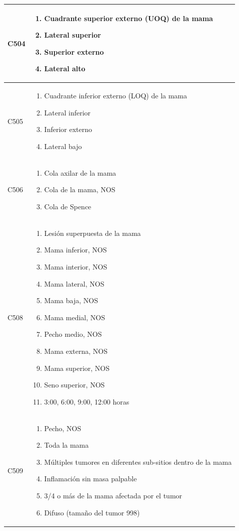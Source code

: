 \begin{table}
\begin{threeparttable}[hbt!]
\begin{tabular}{ p{2cm} p{6cm}}
			\\ \hline
			C504
			& \begin{enumerate}
				\item Cuadrante superior externo (UOQ) de la mama
				\item Lateral superior
				\item Superior externo
				\item Lateral alto
			\end{enumerate}
		
			\\ \hline
			C505
			& \begin{enumerate}
				\item Cuadrante inferior externo (LOQ) de la mama
				\item Lateral inferior
				\item Inferior externo
				\item Lateral bajo
			\end{enumerate}
		
			\\ \hline
			C506
			& \begin{enumerate}
				\item Cola axilar de la mama
				\item Cola de la mama, NOS
				\item Cola de Spence
			\end{enumerate}
		
			\\ \hline
			C508
			& \begin{enumerate}
				\item Lesión superpuesta de la mama
				\item Mama inferior, NOS
				\item Mama interior, NOS
				\item Mama lateral, NOS
				\item Mama baja, NOS
				\item Mama medial, NOS
				\item Pecho medio, NOS
				\item Mama externa, NOS
				\item Mama superior, NOS
				\item Seno superior, NOS
				\item 3:00, 6:00, 9:00, 12:00 horas
			\end{enumerate}
		
		  \\ \hline
			C509
			& \begin{enumerate}
				\item Pecho, NOS
				\item Toda la mama
				\item Múltiples tumores en diferentes sub-sitios dentro de la mama
				\item Inflamación sin masa palpable
				\item 3/4 o más de la mama afectada por el tumor
				\item Difuso (tamaño del tumor 998)
			\end{enumerate}
		   

\end{tabular}
\end{threeparttable}
\end{table}
